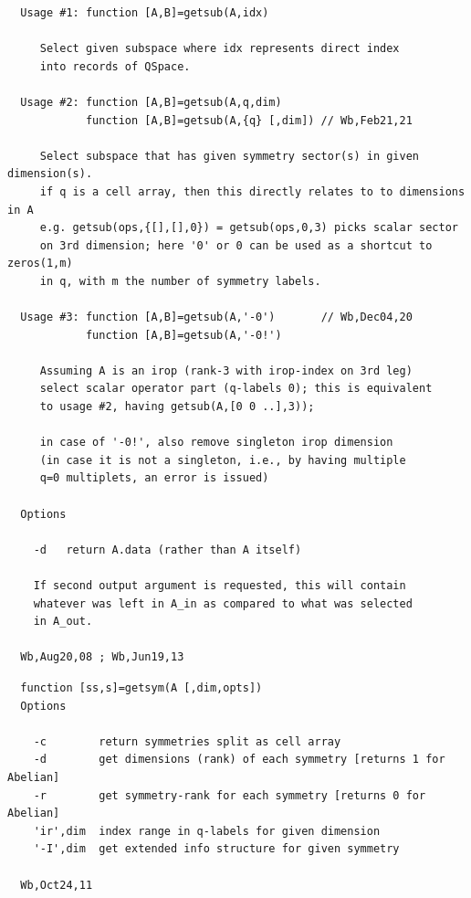 \documentclass[twoside,12pt]{article}
\begin{document}
\begin{verbatim}
  Usage #1: function [A,B]=getsub(A,idx)
 
     Select given subspace where idx represents direct index
     into records of QSpace.
 
  Usage #2: function [A,B]=getsub(A,q,dim)
            function [A,B]=getsub(A,{q} [,dim]) // Wb,Feb21,21
 
     Select subspace that has given symmetry sector(s) in given dimension(s).
     if q is a cell array, then this directly relates to to dimensions in A
     e.g. getsub(ops,{[],[],0}) = getsub(ops,0,3) picks scalar sector
     on 3rd dimension; here '0' or 0 can be used as a shortcut to zeros(1,m)
     in q, with m the number of symmetry labels.
 
  Usage #3: function [A,B]=getsub(A,'-0')       // Wb,Dec04,20
            function [A,B]=getsub(A,'-0!')
 
     Assuming A is an irop (rank-3 with irop-index on 3rd leg)
     select scalar operator part (q-labels 0); this is equivalent
     to usage #2, having getsub(A,[0 0 ..],3));
 
     in case of '-0!', also remove singleton irop dimension
     (in case it is not a singleton, i.e., by having multiple
     q=0 multiplets, an error is issued)
 
  Options
 
    -d   return A.data (rather than A itself)
 
    If second output argument is requested, this will contain
    whatever was left in A_in as compared to what was selected
    in A_out.
 
  Wb,Aug20,08 ; Wb,Jun19,13
\end{verbatim}

\pagebreak[3]



\begin{verbatim}
  function [ss,s]=getsym(A [,dim,opts])
  Options
 
    -c        return symmetries split as cell array
    -d        get dimensions (rank) of each symmetry [returns 1 for Abelian]
    -r        get symmetry-rank for each symmetry [returns 0 for Abelian]
    'ir',dim  index range in q-labels for given dimension
    '-I',dim  get extended info structure for given symmetry
 
  Wb,Oct24,11
\end{verbatim}

\pagebreak[3]
\end{document}
